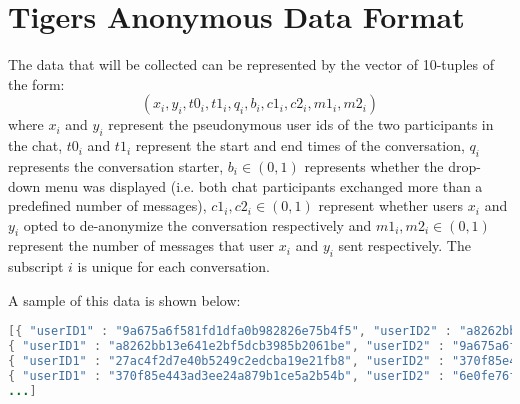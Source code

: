 \section{Tigers Anonymous Data Format}

The data that will be collected can be represented by the vector of 10-tuples of the form: $$(x_i, y_i, t0_i, t1_i, q_i, b_i, c1_i, c2_i, m1_i, m2_i)$$ where $x_i$ and $y_i$ represent the pseudonymous user ids of the two participants in the chat, $t0_i$ and $t1_i$ represent the start and end times of the conversation, $q_i$ represents the conversation starter, $b_i \in {(0, 1)}$ represents whether the drop-down menu was displayed (i.e. both chat participants exchanged more than a predefined number of messages), $c1_i, c2_i \in{(0, 1)}$ represent whether users $x_i$ and $y_i$ opted to de-anonymize the conversation respectively and $m1_i, m2_i \in{(0,1)}$ represent the number of messages that user $x_i$ and $y_i$ sent respectively. The subscript $i$ is unique for each conversation. 

A sample of this data is shown below: 

\begin{lstlisting}[language=java]
[{ "userID1" : "9a675a6f581fd1dfa0b982826e75b4f5", "userID2" : "a8262bb13e641e2bf5dcb3985b2061be", "question" : "Do you believe in love at first sight?", "startTime" : 1390873110621, "endTime" : 1390873162944, "buttonDisplayed" : false, "user1Clicked" : false, "user2Clicked" : false, "user1MessagesSent" : 1, "user2MessagesSent" : 0, "_id" : "52e70a4ac43b6d020079e52d", "__v" : 0 },
{ "userID1" : "a8262bb13e641e2bf5dcb3985b2061be", "userID2" : "9a675a6f581fd1dfa0b982826e75b4f5", "question" : "Do you believe in soul mates?", "startTime" : 1390873219878, "endTime" : 1390873263469, "buttonDisplayed" : false, "user1Clicked" : false, "user2Clicked" : false, "user1MessagesSent" : 1, "user2MessagesSent" : 2, "_id" : "52e70aafc43b6d020079e52e", "__v" : 0 },
{ "userID1" : "27ac4f2d7e40b5249c2edcba19e21fb8", "userID2" : "370f85e443ad3ee24a879b1ce5a2b54b", "question" : "What is one thing you miss about being a kid?", "startTime" : 1390876198530, "endTime" : 1390876307059, "buttonDisplayed" : false, "user1Clicked" : false, "user2Clicked" : false, "user1MessagesSent" : 1, "user2MessagesSent" : 0, "_id" : "52e71693c43b6d020079e52f", "__v" : 0 },
{ "userID1" : "370f85e443ad3ee24a879b1ce5a2b54b", "userID2" : "6e0fe76fca80cf2920bd5fc7717cf6dd", "question" : "What's one thing that you learned this week?", "startTime" : 1390881063228, "endTime" : 1390882681992, "buttonDisplayed" : true, "user1Clicked" : true, "user2Clicked" : true, "user1MessagesSent" : 33, "user2MessagesSent" : 37, "_id" : "52e72f79c43b6d020079e531", "__v" : 0 },
...]
\end{lstlisting}

